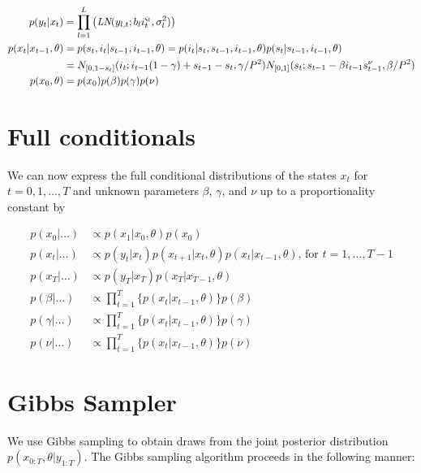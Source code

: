 \documentclass{article}
\begin{document}
\begin{align*}
p(y_t|x_t) &= \prod_{l=1}^L \left(\emph{LN}(y_{l,t};b_li_t^{\varsigma_l},\sigma_l^2)\right) \\
p(x_t|x_{t-1},\theta) &= p(s_t,i_t|s_{t-1},i_{t-1},\theta) = p(i_t|s_t,s_{t-1},i_{t-1},\theta)p(s_t|s_{t-1},i_{t-1},\theta) \\
&= N_{[0,1-s_t]}(i_t;i_{t-1}(1 - \gamma) + s_{t-1} - s_t, \gamma / P^2)N_{[0,1]}(s_t; s_{t-1} - \beta i_{t-1}s^{\nu}_{t-1}, \beta / P^2) \\
p(x_0,\theta) &= p(x_0)p(\beta)p(\gamma)p(\nu)
\end{align*}

\section{Full conditionals} \label{sec:fullcond}
We can now express the full conditional distributions of the states $x_t$ for $t = 0, 1, \ldots, T$ and unknown parameters $\beta$, $\gamma$, and $\nu$ up to a proportionality constant by

\begin{align*}
p(x_0|\hdots) &\propto p(x_1|x_0,\theta)p(x_0) \\
p(x_t|\hdots) &\propto p(y_t|x_t)p(x_{t+1}|x_t,\theta)p(x_t|x_{t-1},\theta) \mbox{, for } t = 1,\ldots,T-1 \\
p(x_T|\hdots) &\propto p(y_T|x_T)p(x_T|x_{T-1},\theta) \\
p(\beta|\hdots) &\propto \prod_{t=1}^T \{p(x_t|x_{t-1},\theta)\}p(\beta) \\
p(\gamma|\hdots) &\propto \prod_{t=1}^T \{p(x_t|x_{t-1},\theta)\}p(\gamma) \\
p(\nu|\hdots) &\propto \prod_{t=1}^T \{p(x_t|x_{t-1},\theta)\}p(\nu)
\end{align*}

\section{Gibbs Sampler} \label{sec:gibbs}

We use Gibbs sampling to obtain draws from the joint posterior distribution $p(x_{0:T},\theta|y_{1:T})$. The Gibbs sampling algorithm proceeds in the following manner:
\end{document}
